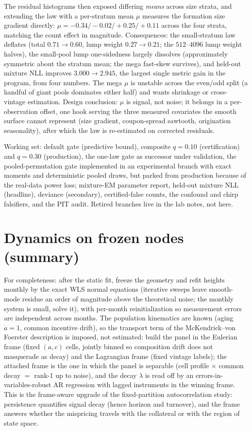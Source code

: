 \documentclass[11pt]{article}
\begin{document}
The residual histograms then exposed differing \emph{means} across size
strata, and extending the law with a per-stratum mean $\mu$ measures
the formation size gradient directly: $\mu = -0.34 / -0.02 / +0.25 /
+0.11$ across the four strata, matching the count effect in magnitude.
Consequences: the small-stratum law deflates (total $0.71\to0.60$,
lump weight $0.27\to0.21$; the $512$--$4096$ lump weight halves), the
small-pool lump one-sidedness largely dissolves (approximately
symmetric about the stratum mean; the mega fast-skew survives), and
held-out mixture NLL improves $3.000\to2.945$, the largest single
metric gain in the program, from four numbers. The mega $\mu$ is unstable across the
even/odd split (a handful of giant pools dominates either half) and
wants shrinkage or cross-vintage estimation. Design conclusion: $\mu$
is signal, not noise; it belongs in a per-observation offset, one hook
serving the three measured covariates the smooth surface cannot
represent (size gradient, coupon-spread sawtooth, origination
seasonality), after which the law is re-estimated on corrected
residuals.

Working set: default gate (predictive bound), composite $q=0.10$
(certification) and $q=0.30$ (production), the one-law gate as
successor under validation, the pooled-permutation gate implemented in an experimental branch with exact moments and deterministic pooled draws, but parked from production because of the real-data power loss; mixture-EM parameter report, held-out mixture NLL
(headline), deviance (secondary), certified-false counts, the confound
and chirp falsifiers, and the PIT audit. Retired branches live in the
lab notes, not here.

\section{Dynamics on frozen nodes (summary)}\label{sec:dynamics}

For completeness: after the static fit, freeze the geometry and refit heights monthly
by the exact WLS normal equations (iterative sweeps leave smooth-mode residue an order
of magnitude above the theoretical noise; the monthly system is small, solve it), with
per-month reinitialization so measurement errors are independent across months. The
population kinematics are known (aging $\dot a=1$, common incentive drift), so the
transport term of the McKendrick--von Foerster description is imposed, not estimated:
build the panel in the Eulerian frame (fixed $(a,c)$ cells, jointly binned so
composition drift does not masquerade as decay) and the Lagrangian frame (fixed vintage
labels); the attached frame is the one in which the panel is separable
(cell profile $\times$ common decay $=$ rank-1 up to noise), and the decay $\lambda$ is
read off by an errors-in-variables-robust AR regression with lagged instruments in the
winning frame. This is the frame-aware upgrade of the fixed-partition autocorrelation
study: persistence quantifies signal decay (hence horizon and turnover), and the frame
answers whether the mispricing travels with the collateral or with the region of state
space.
\end{document}
